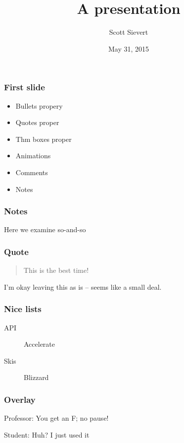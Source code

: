 \documentclass{beamer}
\title{A presentation}
\author{Scott Sievert}
\institute{UW-Madison}
\date{May 31, 2015}
\begin{document}
\maketitle

\begin{frame}
    \frametitle{First slide}
    \begin{itemize}
        \item Bullets propery
        \item Quotes proper
        \item Thm boxes proper
        \item Animations
        \item Comments
        \item Notes
    \end{itemize}
\end{frame}

\begin{frame}
    \frametitle{Notes}
    Here we examine so-and-so
\end{frame}

\begin{frame}
    \frametitle{Quote}
    \begin{quotation}
        This is the best time!
    \end{quotation}
    I'm okay leaving this as is -- seems like a small deal.
\end{frame}

\begin{frame}
    \frametitle{Nice lists}
    \begin{description}
        \item[API] Accelerate
        \item[Skis] Blizzard
    \end{description}
\end{frame}

\begin{frame}
    \frametitle{Overlay}
    Professor: You get an F; no pause!

    \pause

    Student: Huh? I just used it
\end{frame}
\end{document}
